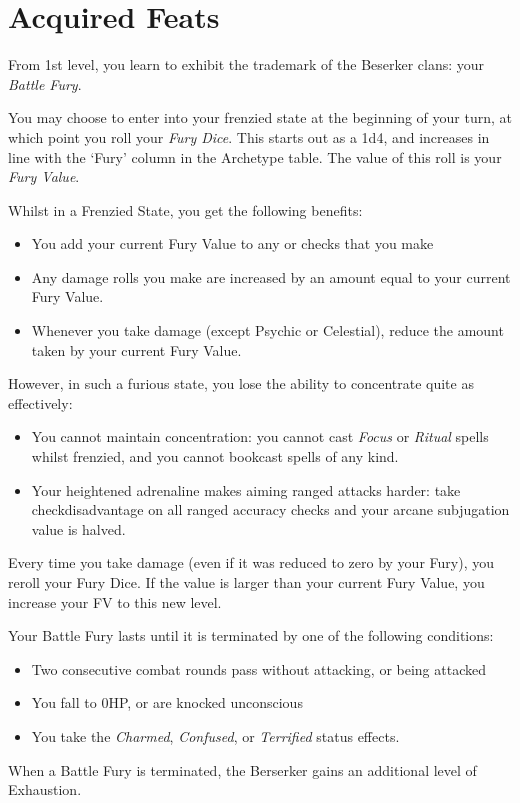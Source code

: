 \section*{Acquired Feats}

{
From 1st level, you learn to exhibit the trademark of the Beserker clans: your {\it Battle Fury}. 

You may choose to enter into your frenzied state at the beginning of your turn, at which point you roll your {\it Fury Dice}. This starts out as a 1d4, and increases in line with the `Fury' column in the Archetype table. The value of this roll is your {\it Fury Value}.


Whilst in a Frenzied State, you get the following benefits:

\begin{itemize}
	\item You add your current Fury Value to any \attPhys{} or \attSpr{} checks that you make
	\item Any damage rolls you make are increased by an amount equal to your current Fury Value. 
	\item Whenever you take damage (except Psychic or Celestial), reduce the amount taken by your current Fury Value. 
\end{itemize} 

However, in such a furious state, you lose the ability to concentrate quite as effectively:
\begin{itemize}
	\item You cannot maintain concentration: you cannot cast {\it Focus} or {\it Ritual} spells whilst frenzied, and you cannot book\minus{}cast spells of any kind. 
	\item Your heightened adrenaline makes aiming ranged attacks harder: take check\minus{}disadvantage on all ranged accuracy checks and your arcane subjugation value is halved. 
\end{itemize}


Every time you take damage (even if it was reduced to zero by your Fury), you re\minus{}roll your Fury Dice. If the value is larger than your current Fury Value, you increase your FV to this new level.

Your Battle Fury lasts until it is terminated by one of the following conditions:
\begin{itemize}
	\item Two consecutive combat rounds pass without attacking, or being attacked
	\item You fall to 0HP, or are knocked unconscious
	\item You take the {\it Charmed}, {\it Confused}, or {\it Terrified} status effects. 
\end{itemize}

When a Battle Fury is terminated, the Berserker gains an additional level of Exhaustion. 

}

